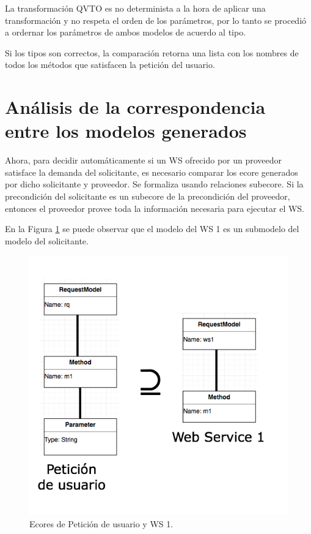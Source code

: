 

La transformación QVTO es no determinista a la hora de aplicar una transformación y no respeta el orden de los parámetros, por lo tanto se procedió a ordernar los parámetros de ambos modelos de acuerdo al tipo.

Si los tipos son correctos, la comparación retorna una lista con los nombres de todos los métodos que satisfacen la petición del usuario.

\section{Análisis de la correspondencia entre los modelos generados}

Ahora, para decidir automáticamente si un WS ofrecido por un proveedor satisface la demanda del solicitante, es necesario comparar los ecore generados por dicho solicitante y proveedor. Se formaliza usando relaciones subecore. Si la precondición del solicitante es un subecore de la precondición del proveedor, entonces el proveedor provee toda la información necesaria para ejecutar el WS.

En la Figura \ref{fig:Ecores de Petición de usuario y WS 1} se puede observar que el modelo del WS 1 es un submodelo del modelo del solicitante.

\begin{figure}[!h] 
	\begin{center}
		\includegraphics [scale=0.60]{imagenes/Ecores_de_Peticion_de_usuario_y_WS_1.jpg}
	\end{center}
	\caption{Ecores de Petición de usuario y WS 1.}
	\label{fig:Ecores de Petición de usuario y WS 1}
\end{figure} 

